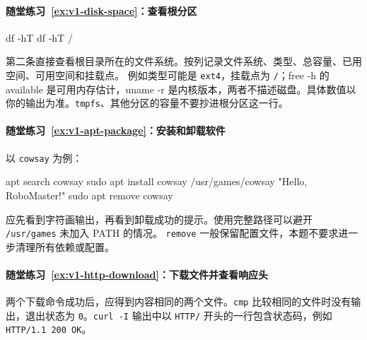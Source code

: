 \paragraph*{随堂练习~\ref{ex:v1-disk-space}：查看根分区}
\begin{solution}

\begin{tbash}
df -hT
df -hT /
\end{tbash}

第二条直接查看根目录所在的文件系统。按列记录文件系统、类型、总容量、已用空间、可用空间和挂载点。
例如类型可能是 \texttt{ext4}，挂载点为 \texttt{/}；free -h 的 available 是可用内存估计，uname -r 是内核版本，两者不描述磁盘。具体数值以你的输出为准。\texttt{tmpfs}、其他分区的容量不要抄进根分区这一行。
\end{solution}

\paragraph*{随堂练习~\ref{ex:v1-apt-package}：安装和卸载软件}
\begin{solution}
以 \texttt{cowsay} 为例：

\begin{tbash}
apt search cowsay
sudo apt install cowsay
/usr/games/cowsay "Hello, RoboMaster!"
sudo apt remove cowsay
\end{tbash}

应先看到字符画输出，再看到卸载成功的提示。使用完整路径可以避开 \texttt{/usr/games} 未加入 PATH 的情况。
\texttt{remove} 一般保留配置文件，本题不要求进一步清理所有依赖或配置。
\end{solution}

\paragraph*{随堂练习~\ref{ex:v1-http-download}：下载文件并查看响应头}
\begin{solution}
两个下载命令成功后，应得到内容相同的两个文件。\texttt{cmp} 比较相同的文件时没有输出，退出状态为 \texttt{0}。\texttt{curl -I} 输出中以 \texttt{HTTP/} 开头的一行包含状态码，例如 \texttt{HTTP/1.1 200 OK}。
\end{solution}

